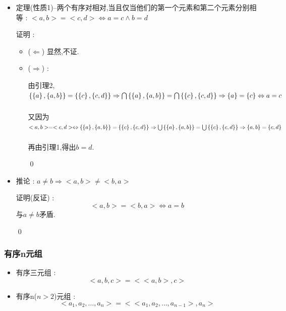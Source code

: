 {{{\begin{itemize}
{          证明 : \begin{enumerate}
            \item $\forall x,x \in \updownUnion{~}{~}\mathcal{A} \Leftrightarrow \exists z(z \in \mathcal{A} \land x \in z) \Leftrightarrow \exists z(z \in \mathcal{B} \land x \in z) \Leftrightarrow x \in \updownUnion{~}{~}\mathcal{B}$
            \item $\forall x,x \in \updownIntersection{~}{~}\mathcal{A} \Leftrightarrow \forall z(z \in \mathcal{A} \land x \in z) \Leftrightarrow \forall z(z \in \mathcal{B} \land x \in z) \Leftrightarrow x \in \updownIntersection{~}{~}\mathcal{B}$
          \end{enumerate}

          \qed
          }
    \item {
          定理(性质1)--两个有序对相对,当且仅当他们的第一个元素和第二个元素分别相等 : $<a,b> = <c,d> \Leftrightarrow a = c \land b = d$

          证明 : \begin{itemize}
            \item ($\Leftarrow$) 显然,不证.
            \item{
                  ($\Rightarrow$) :

                  由引理2,$\left\{ \left\{ a \right\},\left\{ a,b \right\} \right\} = \left\{ \left\{ c \right\},\left\{ c,d \right\} \right\} \Rightarrow \bigcap\limits_{~}^{~}\left\{ \left\{ a \right\},\left\{ a,b \right\} \right\} = \bigcap\limits_{~}^{~}\left\{ \left\{ c \right\},\left\{ c,d \right\} \right\} \Rightarrow \left\{ a \right\} = \left\{ c \right\} \Leftrightarrow a = c$

                  又因为$<a,b> = <c,d> \Leftrightarrow \left\{ \left\{ a \right\},\left\{ a,b \right\} \right\} = \left\{ \left\{ c \right\},\left\{ c,d \right\} \right\} \Rightarrow \bigcup\limits_{~}^{~}\left\{ \left\{ a \right\},\left\{ a,b \right\} \right\} = \bigcup\limits_{~}^{~}\left\{ \left\{ c \right\},\left\{ c,d \right\} \right\} \Rightarrow \left\{ a,b \right\} = \left\{ c,d \right\}$

                  再由引理1,得出$b = d$.

                  \qed
                  }
          \end{itemize}
          }
    \item {
          推论 : $a \neq b \Rightarrow <a,b> \neq <b,a>$

          证明(反证) : $$
            <a,b> = <b,a> \Leftrightarrow a = b
          $$
          与$a \neq b$矛盾.

          \qed
          }
  \end{itemize}
}%

\subsubsection{有序n元组}{
  \begin{itemize}
    \item {
          有序三元组 : $$
            <a,b,c> = <<a,b>,c>
          $$
          }
    \item {
          有序n($n > 2$)元组 : $$
            <a_1,a_2,\dots,a_n> = <<a_1,a_2,\dots,a_{n - 1}>,a_n>
          $$
          }
  \end{itemize}

}}}
